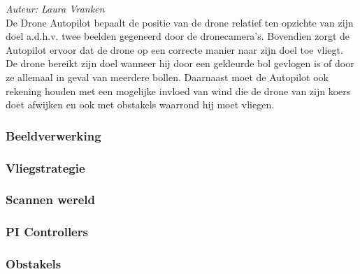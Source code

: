{\em Auteur: Laura Vranken}\\

\noindent
De Drone Autopilot bepaalt de positie van de drone relatief ten opzichte van zijn doel a.d.h.v. twee beelden gegeneerd door de dronecamera's. Bovendien zorgt de Autopilot ervoor dat de drone op een correcte manier naar zijn doel toe vliegt. De drone bereikt zijn doel wanneer hij door een gekleurde bol gevlogen is of door ze allemaal in geval van meerdere bollen.  Daarnaast moet de Autopilot ook rekening houden met een mogelijke invloed van wind die de drone van zijn koers doet afwijken en ook met obstakels waarrond hij moet vliegen.

\subsubsection{Beeldverwerking}
\label{subsec: Beeldverwerking}


\subsubsection{Vliegstrategie}
\label{subsec: Vliegstrategie}


\subsubsection{Scannen wereld}
\label{subsec: Scannen wereld}


\subsubsection{PI Controllers}
\label{subsec: PI Controllers}


\subsubsection{Obstakels}
\label{subsec: Obstakels}




















